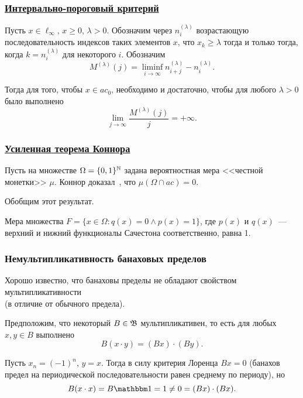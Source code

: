 \begin{frame}\frametitle{\underline{Интервально-пороговый критерий}}
	\begin{ttheorem}
		Пусть $x\in\ell_\infty$, $x \geq 0$, $\lambda>0$.
		Обозначим через $n^{(\lambda)}_i$ возрастающую последовательность
		индексов таких элементов $x$, что $x_k \geq \lambda$ тогда и только тогда,
		когда $k=n^{(\lambda)}_i$ для некоторого $i$.
		Обозначим
		\begin{equation}
			M^{(\lambda)}(j) = \liminf_{i\to\infty} n^{(\lambda)}_{i+j} - n^{(\lambda)}_i
			.
		\end{equation}


		Тогда для того, чтобы $x\in ac_0$, необходимо и достаточно, чтобы
		для любого $\lambda>0$ было выполнено
		\begin{equation}
			\lim_{j \to \infty} \frac{M^{(\lambda)}(j)}{j} = +\infty
			.
		\end{equation}
	\end{ttheorem}
\end{frame}


\begin{frame}\frametitle{\underline{Усиленная теорема Коннора}}
	Пусть на множестве $\Omega=\{0,1\}^{\mathbb{N}}$ задана вероятностная мера <<честной монетки>> $\mu$.
	Коннор доказал~\cite{connor1990almost}, что $\mu(\Omega\cap ac)=0$.

	Обобщим этот результат.

	\begin{ttheorem}
	Мера множества $F=\{x\in\Omega : q(x) = 0 \wedge p(x)= 1\}$,
	где $p(x)$ и $q(x)$~--- верхний и нижний функционалы Сачестона соответственно,
	равна 1.
	\end{ttheorem}
\end{frame}


\begin{frame}\frametitle{Немультипликативность банаховых пределов}
	Хорошо известно,
	что банаховы пределы не обладают свойством мультипликативности
	\\
	(в отличие от обычного предела).

	Предположим, что некоторый $B\in \mathfrak{B}$ мультипликативен,
	то есть для любых $x,y\in B$ выполнено
	\begin{equation}
		B(x\cdot y) = (Bx)\cdot (By)
		.
	\end{equation}

	Пусть $x_n = (-1)^n$, $y=x$.
	Тогда в силу критерия Лоренца $Bx = 0$
	(банахов предел на периодической последовательности равен среднему по периоду),
	но
	\begin{equation}
		B(x\cdot x) = B\one = 1 \ne 0 = (Bx) \cdot (Bx)
		.
	\end{equation}


\end{frame}


